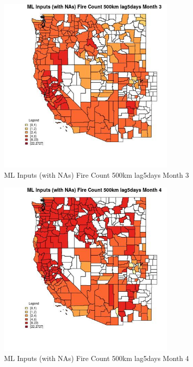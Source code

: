 \begin{figure} 
\centering  
\includegraphics[width=0.77\textwidth]{Code_Outputs/Report_ML_input_PM25_Step4_part_f_de_duplicated_aves_prioritize_24hr_obswNAs_CountyFire_Count_500km_lag5daysmedianMonth3.jpg} 
\caption{\label{fig:Report_ML_input_PM25_Step4_part_f_de_duplicated_aves_prioritize_24hr_obswNAsCountyFire_Count_500km_lag5daysmedianMonth3}ML Inputs (with NAs) Fire Count 500km lag5days Month 3} 
\end{figure} 
 

\begin{figure} 
\centering  
\includegraphics[width=0.77\textwidth]{Code_Outputs/Report_ML_input_PM25_Step4_part_f_de_duplicated_aves_prioritize_24hr_obswNAs_CountyFire_Count_500km_lag5daysmedianMonth4.jpg} 
\caption{\label{fig:Report_ML_input_PM25_Step4_part_f_de_duplicated_aves_prioritize_24hr_obswNAsCountyFire_Count_500km_lag5daysmedianMonth4}ML Inputs (with NAs) Fire Count 500km lag5days Month 4} 
\end{figure} 
 

